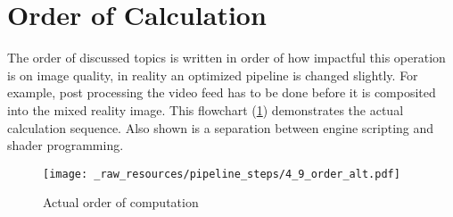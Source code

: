 %
\section{Order of Calculation}

The order of discussed topics is written in order of how impactful this 
operation is on image quality, in reality an optimized pipeline is changed 
slightly. For example, post processing the video feed has to be done before it 
is composited into the mixed reality image. This flowchart 
(\ref{fig:steps:order:alt}) demonstrates the actual calculation sequence. Also 
shown is a separation between engine scripting and shader programming.

\begin{figure}[htb]
	\texttt{[image: \_raw\_resources/pipeline\_steps/4\_9\_order\_alt.pdf]}
	\caption{Actual order of computation}
	\label{fig:steps:order:alt}
\end{figure}